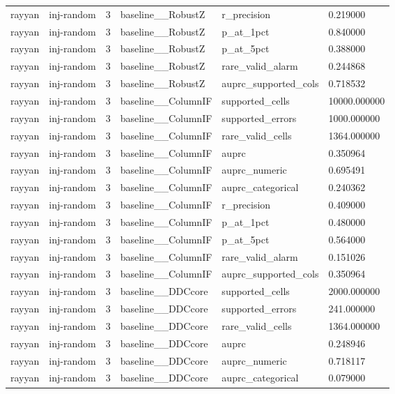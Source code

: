 \begin{tabular}{llllll}
rayyan & inj-random & 3 & baseline\_\_RobustZ & r\_precision & 0.219000 \\
rayyan & inj-random & 3 & baseline\_\_RobustZ & p\_at\_1pct & 0.840000 \\
rayyan & inj-random & 3 & baseline\_\_RobustZ & p\_at\_5pct & 0.388000 \\
rayyan & inj-random & 3 & baseline\_\_RobustZ & rare\_valid\_alarm & 0.244868 \\
rayyan & inj-random & 3 & baseline\_\_RobustZ & auprc\_supported\_cols & 0.718532 \\
rayyan & inj-random & 3 & baseline\_\_ColumnIF & supported\_cells & 10000.000000 \\
rayyan & inj-random & 3 & baseline\_\_ColumnIF & supported\_errors & 1000.000000 \\
rayyan & inj-random & 3 & baseline\_\_ColumnIF & rare\_valid\_cells & 1364.000000 \\
rayyan & inj-random & 3 & baseline\_\_ColumnIF & auprc & 0.350964 \\
rayyan & inj-random & 3 & baseline\_\_ColumnIF & auprc\_numeric & 0.695491 \\
rayyan & inj-random & 3 & baseline\_\_ColumnIF & auprc\_categorical & 0.240362 \\
rayyan & inj-random & 3 & baseline\_\_ColumnIF & r\_precision & 0.409000 \\
rayyan & inj-random & 3 & baseline\_\_ColumnIF & p\_at\_1pct & 0.480000 \\
rayyan & inj-random & 3 & baseline\_\_ColumnIF & p\_at\_5pct & 0.564000 \\
rayyan & inj-random & 3 & baseline\_\_ColumnIF & rare\_valid\_alarm & 0.151026 \\
rayyan & inj-random & 3 & baseline\_\_ColumnIF & auprc\_supported\_cols & 0.350964 \\
rayyan & inj-random & 3 & baseline\_\_DDCcore & supported\_cells & 2000.000000 \\
rayyan & inj-random & 3 & baseline\_\_DDCcore & supported\_errors & 241.000000 \\
rayyan & inj-random & 3 & baseline\_\_DDCcore & rare\_valid\_cells & 1364.000000 \\
rayyan & inj-random & 3 & baseline\_\_DDCcore & auprc & 0.248946 \\
rayyan & inj-random & 3 & baseline\_\_DDCcore & auprc\_numeric & 0.718117 \\
rayyan & inj-random & 3 & baseline\_\_DDCcore & auprc\_categorical & 0.079000 \\

\end{tabular}
